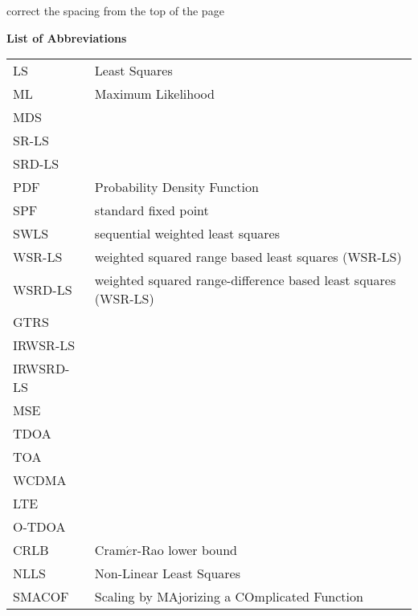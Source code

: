 \newpage
{}

\phantom{m}

correct the spacing from the top of the page

\begin{flushleft}
\begin{Huge}
\textbf{List of Abbreviations}
\end{Huge}
\end{flushleft}

\begin{table}[h]
\begin{tabular}{l l} 
LS & Least Squares \\
ML & Maximum Likelihood \\
MDS &  \\
SR-LS  & \\
SRD-LS & \\
PDF & Probability Density Function \\
SPF & standard fixed point\\
SWLS & sequential weighted least squares \\
WSR-LS & weighted squared range based least squares (WSR-LS)\\
WSRD-LS & weighted squared range-difference based least squares (WSR-LS)\\
GTRS & \\
IRWSR-LS & \\
IRWSRD-LS & \\
MSE & \\
TDOA & \\
TOA & \\
WCDMA & \\
LTE & \\
O-TDOA & \\
CRLB & Cram$\acute{e}$r-Rao  lower  bound \\
NLLS & Non-Linear Least Squares \\
SMACOF & Scaling by MAjorizing a COmplicated Function \\
\end{tabular}
\end{table}
